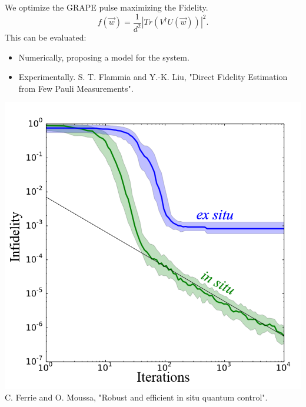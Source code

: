 \documentclass[12pt,aspectratio=169]{beamer}
\begin{document}
	\begin{frame}
		
		\begin{minipage}{0.5\linewidth}
			We optimize the GRAPE pulse maximizing the Fidelity.
			\begin{equation*}
				f(\vec{w}) = \frac{1}{d^2} |  Tr( V^\dagger U(\vec{w})  ) |^2.
			\end{equation*}
			This can be evaluated:
			\begin{itemize}
				\item Numerically, proposing a model for the system.
				\item Experimentally. {\scriptsize S. T. Flammia and Y.-K. Liu, "Direct Fidelity Estimation from Few Pauli Measurements"}.
			\end{itemize}
		\end{minipage}%
		\begin{minipage}{0.5\linewidth}
			\centering
			\includegraphics[scale=0.45]{fidelidad.png}\\
			{\scriptsize C. Ferrie and O. Moussa, "Robust and efficient in situ quantum control".}
		\end{minipage}
		
	\end{frame}
	
\end{document}
